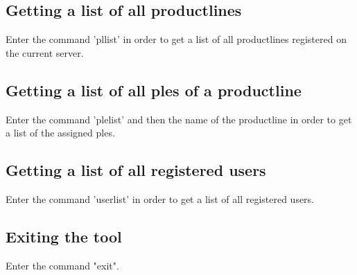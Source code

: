 \subsection{Getting a list of all productlines}
Enter the command 'pllist' in order to get a list of all productlines registered on the 
current server.

\subsection{Getting a list of all ples of a productline}
Enter the command 'plelist' and then the name of the productline in order to get a list
 of the assigned ples.
 
\subsection{Getting a list of all registered users}
Enter the command 'userlist' in order to get a list of all registered users.

\subsection{Exiting the tool}
Enter the command "exit".